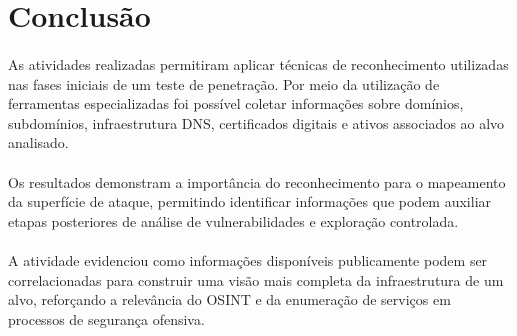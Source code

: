 \section{Conclusão}

\paragraph{}
As atividades realizadas permitiram aplicar técnicas de reconhecimento
utilizadas nas fases iniciais de um teste de penetração. Por meio da
utilização de ferramentas especializadas foi possível coletar informações
sobre domínios, subdomínios, infraestrutura DNS, certificados digitais e
ativos associados ao alvo analisado.

\paragraph{}
Os resultados demonstram a importância do reconhecimento para o mapeamento da
superfície de ataque, permitindo identificar informações que podem auxiliar
etapas posteriores de análise de vulnerabilidades e exploração controlada.

\paragraph{}
A atividade evidenciou como informações disponíveis publicamente podem ser
correlacionadas para construir uma visão mais completa da infraestrutura de um
alvo, reforçando a relevância do OSINT e da enumeração de serviços em
processos de segurança ofensiva.
